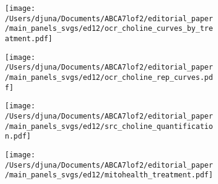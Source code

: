 \documentclass[12pt]{article}
\begin{document}
\begin{figure}[H]
\begin{subfigure}[t]{0.2\textwidth}
    \end{subfigure}
    \hspace{.25cm}
    \begin{subfigure}[t]{.25\textwidth}
        \caption{}
        \texttt{[image: /Users/djuna/Documents/ABCA7lof2/editorial\_paper/main\_panels\_svgs/ed12/ocr\_choline\_curves\_by\_treatment.pdf]}        
    \end{subfigure}
    \begin{subfigure}[t]{.25\textwidth}
        \caption{}
        \texttt{[image: /Users/djuna/Documents/ABCA7lof2/editorial\_paper/main\_panels\_svgs/ed12/ocr\_choline\_rep\_curves.pdf]}        
    \end{subfigure}
    \begin{subfigure}[t]{.22\textwidth}
        \caption{}
        \texttt{[image: /Users/djuna/Documents/ABCA7lof2/editorial\_paper/main\_panels\_svgs/ed12/src\_choline\_quantification.pdf]}        
    \end{subfigure}
    \hspace{.25cm}
    \begin{subfigure}[t]{.45\textwidth}
        \caption{}
        \texttt{[image: /Users/djuna/Documents/ABCA7lof2/editorial\_paper/main\_panels\_svgs/ed12/mitohealth\_treatment.pdf]}        
    \end{subfigure}
\end{figure}
\end{document}
